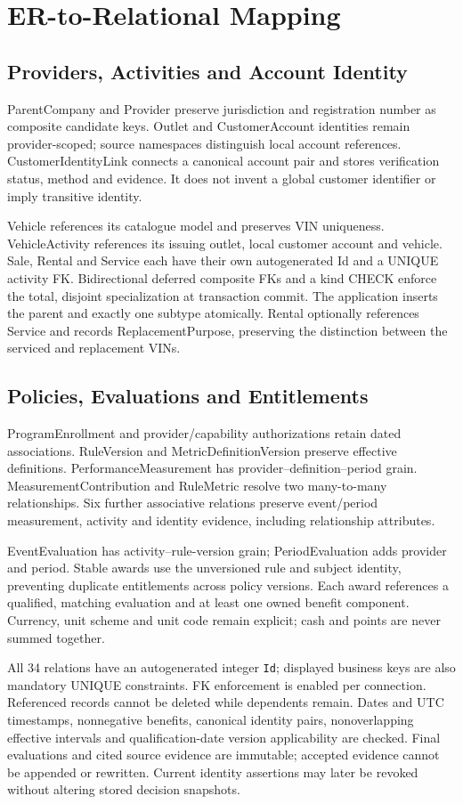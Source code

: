 \documentclass[sigconf]{acmart}
\begin{document}
\section{ER-to-Relational Mapping}
\subsection{Providers, Activities and Account Identity}
ParentCompany and Provider preserve jurisdiction and registration number as composite candidate keys. Outlet and CustomerAccount identities remain provider-scoped; source namespaces distinguish local account references. CustomerIdentityLink connects a canonical account pair and stores verification status, method and evidence. It does not invent a global customer identifier or imply transitive identity.

Vehicle references its catalogue model and preserves VIN uniqueness. VehicleActivity references its issuing outlet, local customer account and vehicle. Sale, Rental and Service each have their own autogenerated Id and a UNIQUE activity FK. Bidirectional deferred composite FKs and a kind CHECK enforce the total, disjoint specialization at transaction commit. The application inserts the parent and exactly one subtype atomically. Rental optionally references Service and records ReplacementPurpose, preserving the distinction between the serviced and replacement VINs.
\subsection{Policies, Evaluations and Entitlements}
ProgramEnrollment and provider/capability authorizations retain dated associations. RuleVersion and MetricDefinitionVersion preserve effective definitions. PerformanceMeasurement has provider--definition--period grain. MeasurementContribution and RuleMetric resolve two many-to-many relationships. Six further associative relations preserve event/period measurement, activity and identity evidence, including relationship attributes.

EventEvaluation has activity--rule-version grain; PeriodEvaluation adds provider and period. Stable awards use the unversioned rule and subject identity, preventing duplicate entitlements across policy versions. Each award references a qualified, matching evaluation and at least one owned benefit component. Currency, unit scheme and unit code remain explicit; cash and points are never summed together.

All 34 relations have an autogenerated integer \texttt{Id}; displayed business keys are also mandatory UNIQUE constraints. FK enforcement is enabled per connection. Referenced records cannot be deleted while dependents remain. Dates and UTC timestamps, nonnegative benefits, canonical identity pairs, nonoverlapping effective intervals and qualification-date version applicability are checked. Final evaluations and cited source evidence are immutable; accepted evidence cannot be appended or rewritten. Current identity assertions may later be revoked without altering stored decision snapshots.
\end{document}
